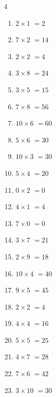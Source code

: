 \begin{multicols}{4}
\begin{enumerate}
  \item $2\times 1$
        $=2$

  \item $7\times 2$
        $=14$

  \item $2\times 2$
        $=4$

  \item $3\times 8$
        $=24$

  \item $3\times 5$
        $=15$

  \item $7\times 8$
        $=56$

  \item $10\times 6$
        $=60$

  \item $5\times 6$
        $=30$

  \item $10\times 3$
        $=30$

  \item $5\times 4$
        $=20$

  \item $0\times 2$
        $=0$

  \item $4\times 1$
        $=4$

  \item $7\times 0$
        $=0$

  \item $3\times 7$
        $=21$

  \item $2\times 9$
        $=18$

  \item $10\times 4$
        $=40$

  \item $9\times 5$
        $=45$

  \item $2\times 2$
        $=4$

  \item $4\times 4$
        $=16$

  \item $5\times 5$
        $=25$

  \item $4\times 7$
        $=28$

  \item $7\times 6$
        $=42$

  \item $3\times 10$
        $=30$


\end{enumerate}
\end{multicols}
